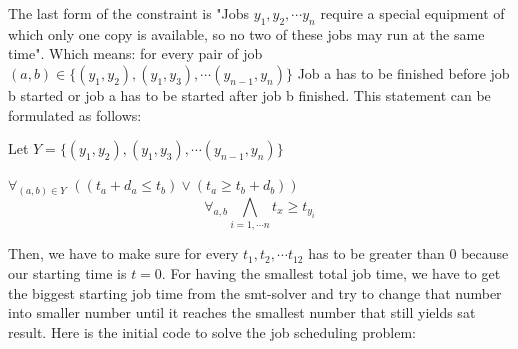 \documentclass[12pt]{article}
\begin{document}
The last form of the constraint is "Jobs $y_1, y_2, \cdots y_n$ require a special equipment of which only one copy is available, so no two of these jobs may run at the same time". Which means: for every pair of job $(a,b) \in \{(y_1, y_2), (y_1, y_3), \cdots (y_{n-1}, y_{n})\}$ Job a has to be finished before job b started or job a has to be started after job b finished. This statement can be formulated as follows:

Let $Y=\{(y_1, y_2), (y_1, y_3), \cdots (y_{n-1}, y_{n})\}$

   {\Large $\forall_{(a,b) \in Y}$} $((t_a + d_a \leq t_b) \vee (t_a \geq t_b+d_b) )$
   \[ \forall_{a,b}\bigwedge_{i=1,\cdots n} t_x \geq t_{y_i} \]

Then, we have to make sure for every $t_1, t_2, \cdots t_12$ has to be greater than 0 because our starting time is $t=0$. For having the smallest total job time, we have to get the biggest starting job time from the smt-solver and try to change that number into smaller number until it reaches the smallest number that still yields sat result. Here is the initial code to solve the job scheduling problem: 
\end{document}
